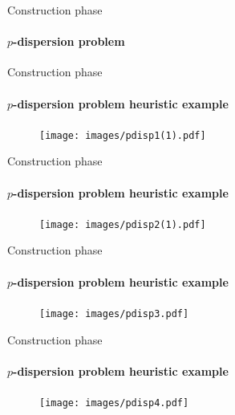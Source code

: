 \documentclass{beamer}
\begin{document}
\begin{frame}{Construction phase}
    \framesubtitle{$p$-dispersion problem}
\end{frame}
\begin{frame}{Construction phase}
    \framesubtitle{$p$-dispersion problem heuristic example}
    \begin{figure}
        \centering
        \texttt{[image: images/pdisp1(1).pdf]}
    \end{figure}
\end{frame}
\begin{frame}{Construction phase}
    \framesubtitle{$p$-dispersion problem heuristic example}
    \begin{figure}
        \centering
        \texttt{[image: images/pdisp2(1).pdf]}
    \end{figure}
\end{frame}
\begin{frame}{Construction phase}
    \framesubtitle{$p$-dispersion problem heuristic example}
    \begin{figure}
        \centering
        \texttt{[image: images/pdisp3.pdf]}
    \end{figure}
\end{frame}
\begin{frame}{Construction phase}
    \framesubtitle{$p$-dispersion problem heuristic example}
    \begin{figure}
        \centering
        \texttt{[image: images/pdisp4.pdf]}
    \end{figure}
\end{frame}
\end{document}
